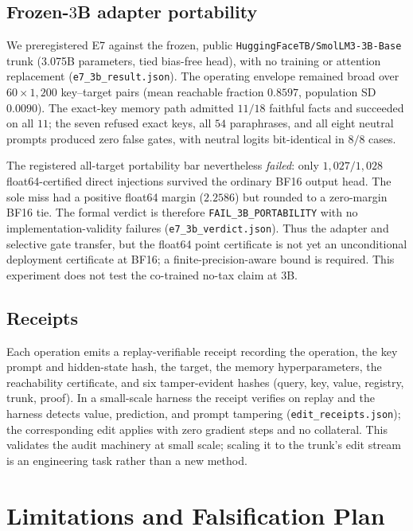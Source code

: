 \documentclass[11pt]{article}
\theoremstyle{remark}
\begin{document}
\subsection{Frozen-$3$B adapter portability}

We preregistered E7 against the frozen, public
\texttt{HuggingFaceTB/SmolLM3-3B-Base} trunk (3.075B parameters, tied bias-free
head), with no training or attention replacement
(\texttt{e7\_3b\_result.json}). The operating envelope remained broad over
$60\times1{,}200$ key--target pairs (mean reachable fraction $0.8597$, population
SD $0.0090$). The exact-key memory path admitted $11/18$ faithful facts and
succeeded on all $11$; the seven refused exact keys, all $54$ paraphrases, and
all eight neutral prompts produced zero false gates, with neutral logits
bit-identical in $8/8$ cases.

The registered all-target portability bar nevertheless \emph{failed}: only
$1{,}027/1{,}028$ float64-certified direct injections survived the ordinary
BF16 output head. The sole miss had a positive float64 margin ($2.2586$) but
rounded to a zero-margin BF16 tie. The formal verdict is therefore
\texttt{FAIL\_3B\_PORTABILITY} with no implementation-validity failures
(\texttt{e7\_3b\_verdict.json}). Thus the adapter and selective gate transfer,
but the float64 point certificate is not yet an unconditional deployment
certificate at BF16; a finite-precision-aware bound is required. This experiment
does not test the co-trained no-tax claim at $3$B.

\subsection{Receipts}
\label{sec:receipts}

Each operation emits a replay-verifiable receipt recording the operation, the key
prompt and hidden-state hash, the target, the memory hyperparameters, the
reachability certificate, and six tamper-evident hashes (query, key, value,
registry, trunk, proof). In a small-scale harness the receipt verifies on replay
and the harness detects value, prediction, and prompt tampering
(\texttt{edit\_receipts.json}); the corresponding
edit applies with zero gradient steps and no collateral. This validates the audit
machinery at small scale; scaling it to the trunk's edit stream is an engineering
task rather than a new method.

\section{Limitations and Falsification Plan}
\label{sec:limits}
\end{document}
